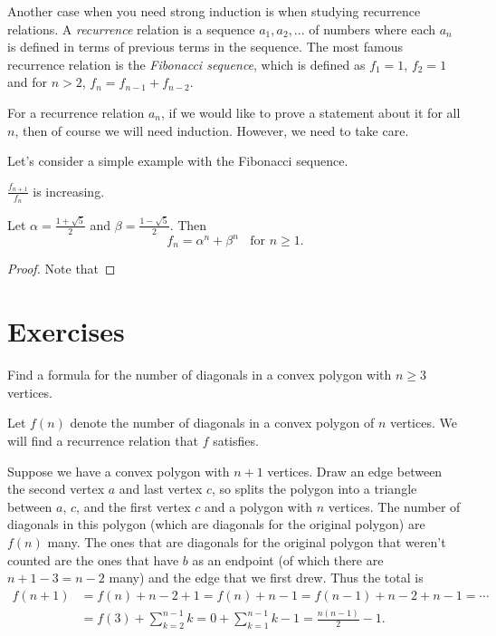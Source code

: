 \documentclass[11pt,dvipsnames]{book}
\numberwithin{equation}{section} %
\numberwithin{figure}{section} %
\numberwithin{table}{section} %
\begin{document}
Another case when you need strong induction is when studying recurrence relations. A {\it recurrence} relation is a sequence $a_{1},a_{2},...$ of numbers  where each $a_{n}$ is defined in terms of previous terms in the sequence. The most famous recurrence relation is the {\it Fibonacci sequence}, which is defined  as $f_{1}=1$, $f_{2}=1$ and for $n>2$, $f_{n}=f_{n-1}+f_{n-2}$. 

For a recurrence relation $a_{n}$, if we would like to prove a statement about it for all $n$, then of course we will need induction. However, we need to take care. 

Let's consider a simple example with the Fibonacci sequence.

\begin{example}
$\frac{f_{n+1}}{f_{n}}$ is increasing.
\end{example}



\begin{example}
Let $\alpha=\frac{1+\sqrt{5}}{2}$ and $\beta=\frac{1-\sqrt{5}}{2}$. Then 
\[
f_{n} = \alpha^{n}+\beta^{n} \;\; \mbox{ for } n\geq 1.
\]
\begin{proof}
Note that 
\end{proof}
\end{example}



\section{Exercises}





\begin{exercise}
 Find a formula for the number of diagonals in a convex polygon with $n\geq 3$ vertices. 
 \end{exercise}

\begin{solution}
Let $f(n)$ denote the number of diagonals in a convex polygon of $n$ vertices. We will find a recurrence relation that $f$ satisfies. 

Suppose we have a convex  polygon with $n+1$ vertices. Draw an edge between the second vertex $a$ and last vertex $c$, so splits the polygon into a triangle between $a$, $c$, and the first vertex $c$ and a polygon with $n$ vertices. The number of diagonals in this polygon (which are diagonals for the original polygon) are $f(n)$ many. The ones that are diagonals for the original polygon that weren't counted are the ones that have $b$ as an endpoint (of which there are $n+1-3=n-2$ many) and the edge that we first drew. Thus the total is
\begin{align*}
f(n+1)
& =f(n)+n-2+1=f(n)+n-1  = f(n-1) + n-2+n-1=\cdots \\
& = f(3) + \sum_{k=2}^{n-1}k
=0+\sum_{k=1}^{n-1}k-1 = \frac{n(n-1)}{2}-1. 
\end{align*}

\end{solution}
\end{document}
